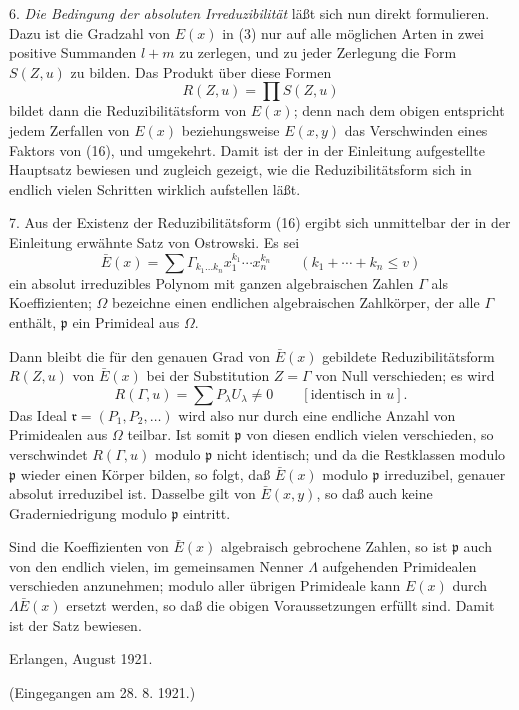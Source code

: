 \documentclass[11pt]{article}
\begin{document}
6. \emph{Die Bedingung der absoluten Irreduzibilität} läßt sich nun direkt formulieren. Dazu ist die Gradzahl von $E(x)$ in (3) nur auf alle möglichen Arten in zwei positive Summanden $l+m$ zu zerlegen, und zu jeder Zerlegung die Form $S(Z,u)$ zu bilden. Das Produkt über diese Formen
\begin{equation}
 R(Z,u)=\prod S(Z,u)
\tag{16}
\end{equation}
bildet dann die Reduzibilitätsform von $E(x)$; denn nach dem obigen entspricht jedem Zerfallen von $E(x)$ beziehungsweise $E(x,y)$ das Verschwinden eines Faktors von (16), und umgekehrt. Damit ist der in der Einleitung aufgestellte Hauptsatz bewiesen und zugleich gezeigt, wie die Reduzibilitätsform sich in endlich vielen Schritten wirklich aufstellen läßt.

7. Aus der Existenz der Reduzibilitätsform (16) ergibt sich unmittelbar der in der Einleitung erwähnte Satz von Ostrowski. Es sei
\[
 \bar E(x)=\sum \Gamma_{k_1\ldots k_n}x_1^{k_1}\cdots x_n^{k_n}
 \qquad(k_1+\cdots+k_n\le v)
\]
ein absolut irreduzibles Polynom mit ganzen algebraischen Zahlen $\Gamma$ als Koeffizienten; $\Omega$ bezeichne einen endlichen algebraischen Zahlkörper, der alle $\Gamma$ enthält, $\mathfrak p$ ein Primideal aus $\Omega$.

Dann bleibt die für den genauen Grad von $\bar E(x)$ gebildete Reduzibilitätsform $R(Z,u)$ von $\bar E(x)$ bei der Substitution $Z=\Gamma$ von Null verschieden; es wird
\[
 R(\Gamma,u)=\sum P_\lambda U_\lambda\ne0\qquad[\text{identisch in }u].
\]
Das Ideal $\mathfrak r=(P_1,P_2,\ldots)$ wird also nur durch eine endliche Anzahl von Primidealen aus $\Omega$ teilbar. Ist somit $\mathfrak p$ von diesen endlich vielen verschieden, so verschwindet $R(\Gamma,u)$ modulo $\mathfrak p$ nicht identisch; und da die Restklassen modulo $\mathfrak p$ wieder einen Körper bilden, so folgt, daß $\bar E(x)$ modulo $\mathfrak p$ irreduzibel, genauer absolut irreduzibel ist. Dasselbe gilt von $\bar E(x,y)$, so daß auch keine Graderniedrigung modulo $\mathfrak p$ eintritt.

Sind die Koeffizienten von $\bar E(x)$ algebraisch gebrochene Zahlen, so ist $\mathfrak p$ auch von den endlich vielen, im gemeinsamen Nenner $\Lambda$ aufgehenden Primidealen verschieden anzunehmen; modulo aller übrigen Primideale kann $E(x)$ durch $\Lambda\bar E(x)$ ersetzt werden, so daß die obigen Voraussetzungen erfüllt sind. Damit ist der Satz bewiesen.

\begin{flushleft}
Erlangen, August 1921.
\end{flushleft}
\begin{center}
(Eingegangen am 28. 8. 1921.)
\end{center}
\end{document}
